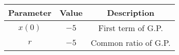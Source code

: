 \begin{tabular}{|c|c|c|}
    \hline
     \textbf{Parameter} & \textbf{Value} &
     \textbf{Description}\\
   
    \hline 
     $x(0)$ &  $-5$ & First term of G.P.\\
     
    \hline
     $r$ & $-5$ & Common ratio of G.P.  \\
      \hline
    
  
								      
\end{tabular}
